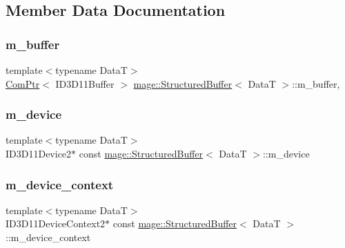 \subsection{Member Data Documentation}
\hypertarget{structmage_1_1_structured_buffer_adbd113ab2fe539e34587887876fe3825}{}\label{structmage_1_1_structured_buffer_adbd113ab2fe539e34587887876fe3825} 
\subsubsection{\texorpdfstring{m\+\_\+buffer}{m\_buffer}}
{\footnotesize\ttfamily template$<$typename DataT$>$ \\
\hyperlink{namespacemage_ae74f374780900893caa5555d1031fd79}{Com\+Ptr}$<$ I\+D3\+D11\+Buffer $>$ \hyperlink{structmage_1_1_structured_buffer}{mage\+::\+Structured\+Buffer}$<$ DataT $>$\+::m\+\_\+buffer\hspace{0.3cm}{\ttfamily [mutable]}, {\ttfamily [private]}}

\hypertarget{structmage_1_1_structured_buffer_ab1ad27b8053f9631f0a74b9e90aa7d3d}{}\label{structmage_1_1_structured_buffer_ab1ad27b8053f9631f0a74b9e90aa7d3d} 
\subsubsection{\texorpdfstring{m\+\_\+device}{m\_device}}
{\footnotesize\ttfamily template$<$typename DataT$>$ \\
I\+D3\+D11\+Device2$\ast$ const \hyperlink{structmage_1_1_structured_buffer}{mage\+::\+Structured\+Buffer}$<$ DataT $>$\+::m\+\_\+device\hspace{0.3cm}{\ttfamily [private]}}

\hypertarget{structmage_1_1_structured_buffer_a1bdf6ee33d3d53bfd3d5f6191fdbc351}{}\label{structmage_1_1_structured_buffer_a1bdf6ee33d3d53bfd3d5f6191fdbc351} 
\subsubsection{\texorpdfstring{m\+\_\+device\+\_\+context}{m\_device\_context}}
{\footnotesize\ttfamily template$<$typename DataT$>$ \\
I\+D3\+D11\+Device\+Context2$\ast$ const \hyperlink{structmage_1_1_structured_buffer}{mage\+::\+Structured\+Buffer}$<$ DataT $>$\+::m\+\_\+device\+\_\+context\hspace{0.3cm}{\ttfamily [private]}}

